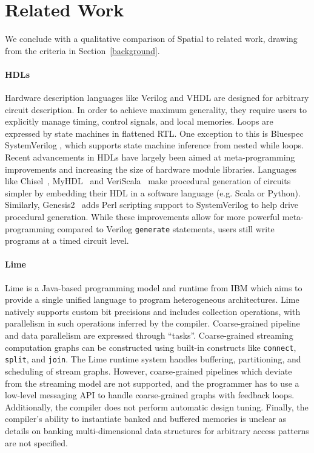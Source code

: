 \section{Related Work}
\label{related}

We conclude with a qualitative comparison of Spatial to related work, drawing from the criteria in Section~\ref{background}.

\paragraph{HDLs}
Hardware description languages like Verilog and VHDL are designed for arbitrary circuit description. In order to achieve maximum generality, they require users to explicitly manage timing, control signals, and local memories. Loops are expressed by state machines in flattened RTL. 
One exception to this is Bluespec SystemVerilog \cite{bluespec}, which supports state machine inference from nested while loops.
Recent advancements in HDLs have largely been aimed at meta-programming improvements and increasing the size of hardware module libraries.
Languages like Chisel~\cite{chisel}, MyHDL~\cite{myhdl} and VeriScala~\cite{veriscala} make procedural generation of circuits simpler by embedding their HDL in a software language (e.g. Scala or Python). Similarly, Genesis2~\cite{genesis2} adds Perl scripting support to SystemVerilog to help drive procedural generation. While these improvements allow for more powerful meta-programming compared to Verilog \texttt{\small{generate}} statements, users still write programs at a timed circuit level.


\paragraph{Lime}
Lime is a Java-based programming model and runtime from IBM which aims to provide a single unified language to program heterogeneous architectures. Lime natively supports custom bit precisions and includes collection operations, with parallelism in such operations inferred by the compiler. Coarse-grained pipeline and data parallelism are expressed through ``tasks''. Coarse-grained streaming computation graphs can be constructed using built-in constructs like \texttt{\small{connect}}, \texttt{\small{split}}, and \texttt{\small{join}}. The Lime runtime system handles buffering, partitioning, and scheduling of stream graphs. However, coarse-grained pipelines which deviate from the streaming model are not supported, and the programmer has to use a low-level messaging API to handle coarse-grained graphs with feedback loops. Additionally, the compiler does not perform automatic design tuning. Finally, the compiler's ability to instantiate banked and buffered memories is unclear as details on banking multi-dimensional data structures for arbitrary access patterns are not specified. 


